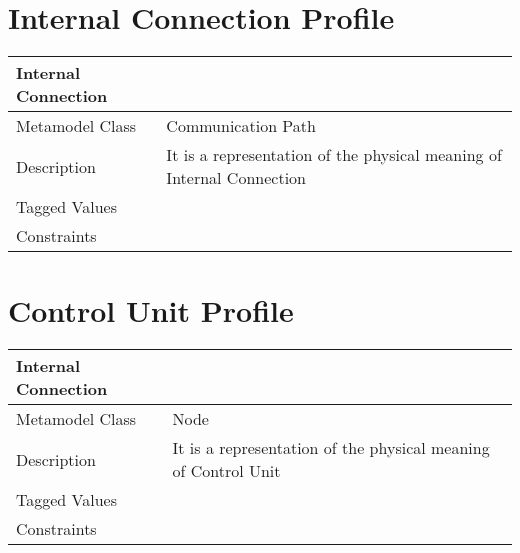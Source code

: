 \section{Internal Connection Profile}

\begin{longtable}{|p{4cm}|p{9cm}|}

\hline
\textbf{Internal Connection} & \\


\hline
Metamodel Class & Communication Path\\

\hline
Description & It is a representation of the physical meaning of Internal Connection\\

\hline
Tagged Values & \\

\hline
Constraints &\\

\hline
\end{longtable}

\section{Control Unit Profile}

\begin{longtable}{|p{4cm}|p{9cm}|}

\hline
\textbf{Internal Connection} & \\


\hline
Metamodel Class & Node\\

\hline
Description & It is a representation of the physical meaning of Control Unit\\

\hline
Tagged Values & \\

\hline
Constraints &\\

\hline
\end{longtable}